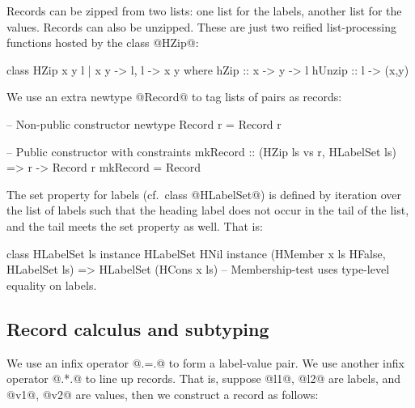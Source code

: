 Records can be zipped from two lists: one list for the labels, another
list for the values. Records can also be unzipped. These are just two
reified list-processing functions hosted by the class @HZip@:

\begin{code}
 class HZip x y l | x y -> l, l -> x y
  where hZip   :: x -> y -> l
        hUnzip :: l -> (x,y)
\end{code}

\noindent
We use an extra newtype @Record@ to tag lists of pairs as records:

\begin{code}
 -- Non-public constructor
 newtype Record r = Record r
\end{code}
\begin{code}
 -- Public constructor with constraints
 mkRecord :: (HZip ls vs r, HLabelSet ls) => r -> Record r
 mkRecord = Record
\end{code}

\noindent
The set property for labels (cf.\ class @HLabelSet@) is defined by
iteration over the list of labels such that the heading label does not
occur in the tail of the list, and the tail meets the set property as
well. That is:

\begin{code}
 class HLabelSet ls
 instance HLabelSet HNil
 instance (HMember x ls HFalse, HLabelSet ls)
       =>  HLabelSet (HCons x ls)
 -- Membership-test uses type-level equality on labels.
\end{code}






\subsection{Record calculus and subtyping}

We use an infix operator @.=.@ to form a label-value pair.  We use
another infix operator @.*.@ to line up records. That is, suppose
@l1@, @l2@ are labels, and @v1@, @v2@ are values, then we construct a
record as follows:

